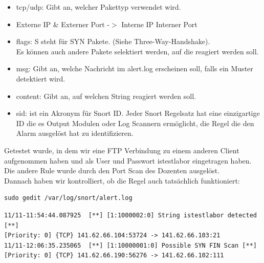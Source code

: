 \documentclass[a4paper]{report}
\begin{document}
\begin{itemize}
\item tcp/udp: Gibt an, welcher Pakettyp verwendet wird.
\item Externe IP \& Externer Port -$>$ Interne IP Interner Port
\item flags: S steht für SYN Pakete. (Siehe Three-Way-Handshake).\\
Es können auch andere Pakete selektiert werden, auf die reagiert werden soll.
\item msg: Gibt an, welche Nachricht im alert.log erscheinen soll, falls ein Muster detektiert wird.
\item content: Gibt an, auf welchen String reagiert werden soll.
\item sid: ist ein Akronym für Snort ID.  Jeder Snort Regelsatz hat eine einzigartige ID die es Output Modulen oder Log Scannern ermöglicht, die Regel die den Alarm ausgelöst hat zu identifizieren. 
\end{itemize}
Getestet wurde, in dem wir eine FTP Verbindung zu einem anderen Client aufgenommen haben und als User und Passwort istestlabor eingetragen haben. Die andere Rule wurde durch den Port Scan des Dozenten ausgelöst.
\\
Dannach haben wir kontrolliert, ob die Regel auch tatsächlich funktioniert:

\begin{lstlisting}
sudo gedit /var/log/snort/alert.log
\end{lstlisting}

\begin{lstlisting}
11/11-11:54:44.087925  [**] [1:1000002:0] String istestlabor detected [**]
[Priority: 0] {TCP} 141.62.66.104:53724 -> 141.62.66.103:21
11/11-12:06:35.235065  [**] [1:10000001:0] Possible SYN FIN Scan [**]
[Priority: 0] {TCP} 141.62.66.190:56276 -> 141.62.66.102:111
\end{lstlisting}
\end{document}
